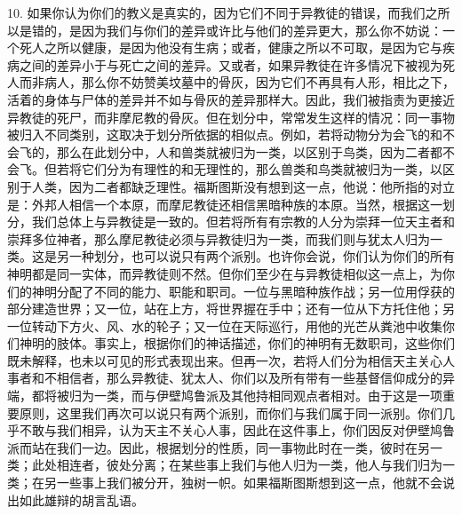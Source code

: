 10. 如果你认为你们的教义是真实的，因为它们不同于异教徒的错误，而我们之所以是错的，是因为我们与你们的差异或许比与他们的差异更大，那么你不妨说：一个死人之所以健康，是因为他没有生病；或者，健康之所以不可取，是因为它与疾病之间的差异小于与死亡之间的差异。又或者，如果异教徒在许多情况下被视为死人而非病人，那么你不妨赞美坟墓中的骨灰，因为它们不再具有人形，相比之下，活着的身体与尸体的差异并不如与骨灰的差异那样大。因此，我们被指责为更接近异教徒的死尸，而非摩尼教的骨灰。但在划分中，常常发生这样的情况：同一事物被归入不同类别，这取决于划分所依据的相似点。例如，若将动物分为会飞的和不会飞的，那么在此划分中，人和兽类就被归为一类，以区别于鸟类，因为二者都不会飞。但若将它们分为有理性的和无理性的，那么兽类和鸟类就被归为一类，以区别于人类，因为二者都缺乏理性。福斯图斯没有想到这一点，他说：他所指的对立是：外邦人相信一个本原，而摩尼教徒还相信黑暗种族的本原。当然，根据这一划分，我们总体上与异教徒是一致的。但若将所有有宗教的人分为崇拜一位天主者和崇拜多位神者，那么摩尼教徒必须与异教徒归为一类，而我们则与犹太人归为一类。这是另一种划分，也可以说只有两个派别。也许你会说，你们认为你们的所有神明都是同一实体，而异教徒则不然。但你们至少在与异教徒相似这一点上，为你们的神明分配了不同的能力、职能和职司。一位与黑暗种族作战；另一位用俘获的部分建造世界；又一位，站在上方，将世界握在手中；还有一位从下方托住他；另一位转动下方火、风、水的轮子；又一位在天际巡行，用他的光芒从粪池中收集你们神明的肢体。事实上，根据你们的神话描述，你们的神明有无数职司，这些你们既未解释，也未以可见的形式表现出来。但再一次，若将人们分为相信天主关心人事者和不相信者，那么异教徒、犹太人、你们以及所有带有一些基督信仰成分的异端，都将被归为一类，而与伊壁鸠鲁派及其他持相同观点者相对。由于这是一项重要原则，这里我们再次可以说只有两个派别，而你们与我们属于同一派别。你们几乎不敢与我们相异，认为天主不关心人事，因此在这件事上，你们因反对伊壁鸠鲁派而站在我们一边。因此，根据划分的性质，同一事物此时在一类，彼时在另一类；此处相连者，彼处分离；在某些事上我们与他人归为一类，他人与我们归为一类；在另一些事上我们被分开，独树一帜。如果福斯图斯想到这一点，他就不会说出如此雄辩的胡言乱语。\par

